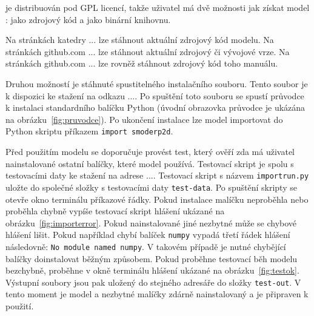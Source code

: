 
  \smod je distribuován pod GPL licencí, takže uživatel má dvě možnosti jak získat model \smod: jako zdrojový kód a jako binární knihovnu. 
  
  Na stránkách katedry ...  lze stáhnout aktuální zdrojový kód modelu. Na stránkách github.com ...  lze stáhnout aktuální zdrojový či vývojové vrze. Na stránkách github.com ...   lze rovněž stáhnout zdrojový kód toho manuálu. 
  
  Druhou možností je stáhnuté spustitelného instalačního souboru. Tento soubor je k dispozici ke stažení na odkazu .... Po spuštění toto souboru se spustí průvodce k instalaci standardního balíčku Python (úvodní obrazovka průvodce je ukázána na obrázku~\ref{fig:pruvodce}). Po ukončení instalace lze model \smod importovat do Python skriptu příkazem {\tt import smoderp2d}. 

  Před použitím modelu se doporučuje provést test, který ověří zda má uživatel nainstalované ostatní balíčky, které model \smod používá. Testovací skript je spolu s testovacími daty ke stažení na adrese .... Testovací skript s názvem {\tt importrun.py} uložte do společné složky s testovacími daty {\tt test-data}. Po spuštění skripty se otevře okno terminálu příkazové řádky. Pokud instalace malíčku \smod neproběhla nebo proběhla chybně vypíše testovací skript hlášení ukázané na obrázku~\ref{fig:importerror}. Pokud nainstalované jiné nezbytné může se chybové hlášení lišit. Pokud například chybí balíček {\tt numpy} vypadá třetí řádek hlášení následovně: {\tt No module named numpy}. V takovém případě je nutné chybějící balíčky doinstalovat běžným způsobem. Pokud proběhne testovací běh modelu \smod bezchybně, proběhne v okně terminálu hlášení ukázané na obrázku~\ref{fig:testok}. Výstupní soubory jsou pak uložený do stejného adresáře do složky {\tt test-out}. V tento moment je model \smod a nezbytné malíčky zdárně nainstalovaný a je připraven k použití.
  
